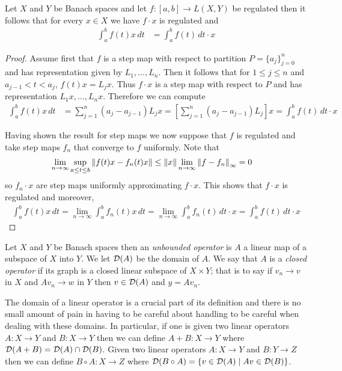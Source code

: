 \begin{prop}\label{RiemannIntegralOfContinuousMaps}Let $X$ and $Y$ be
  Banach spaces and let $f : [a,b] \to L(X,Y)$ be regulated then it
  follows that for every $x \in X$ we have $f \cdot x$ is regulated and 
\begin{align*}
\int_a^b f(t) x \, dt &= \int_a^b f(t) \, dt \cdot x
\end{align*}
\end{prop}
\begin{proof}
  Assume first that $f$ is a step map with respect to partition $P = \lbrace a_j \rbrace_{j=0}^n$ and has representation given by $L_1, \dotsc, L_n$.
  Then it follows that for $1 \leq j \leq n$ and $a_{j-1} < t < a_j$, $f(t) x = L_j x$.   Thus $f \cdot x$ is a step map with respect to $P$ and has
  representation $L_1 x, \dotsc, L_n x$.
Therefore we can compute 
  \begin{align*}
    \int_a^b f(t) x \, dt &= \sum_{j=1}^n (a_j - a_{j-1}) L_j x = \left[ \sum_{j=1}^n (a_j - a_{j-1}) L_j \right] x = \int_a^b f(t) \, dt \cdot x
  \end{align*}

  Having shown the result for step maps we now suppose that $f$ is regulated and take step maps $f_n$ that
  converge to $f$ uniformly.   Note that
  \begin{align*}
    \lim_{n \to \infty} \sup_{a \leq t \leq b} \left \lVert f(t)  x - f_n(t)  x \right \rVert &\leq \left \lVert x \right \rVert  \lim_{n \to \infty} \left \lVert f- f_n  \right \rVert _\infty = 0
  \end{align*}
  so $f_n \cdot x$ are step maps uniformly approximating $f \cdot x$.   This shows that $f \cdot x$ is regulated and moreover,
  \begin{align*}
    \int_a^b f(t) x \, dt = \lim_{n \to \infty} \int_a^b f_n(t) x \, dt = \lim_{n \to \infty} \int_a^b f_n(t) \, dt \cdot x = \int_a^b f(t) \, dt \cdot x 
  \end{align*}
\end{proof}

\begin{defn}Let $X$ and $Y$ be Banach spaces then an \emph{unbounded
    operator} is $A$ a linear
  map of a subspace of $X$ into $Y$.  We let $\mathcal{D}(A)$ be the
  domain of $A$.  We say that $A$ is a \emph{closed
  operator} if its graph is a closed linear subspace of $X \times Y$;
  that is to say if $v_n \to v$ in $X$ and $A v_n \to w$  in $Y$ then
  $v \in \mathcal{D}(A)$ and $y = A v_n$.
\end{defn}

The domain of a linear operator is a crucial part of its definition
and there is no small amount of pain in having to be careful about
handling to be careful when dealing with these domains.  In
particular, if one is given two linear operators $A : X \to Y$ and $B
: X \to Y$ then we
can define $A+B : X \to Y$ where $\mathcal{D}(A+B) = \mathcal{D}(A) \cap
\mathcal{D}(B)$.  
Given two linear operators $A : X \to Y$ and $B
: Y \to Z$ then we
can define $B \circ A: X \to Z$ where $\mathcal{D}(B \circ A) = \lbrace v
\in \mathcal{D}(A) \mid Av \in \mathcal{D}(B) \rbrace$.

